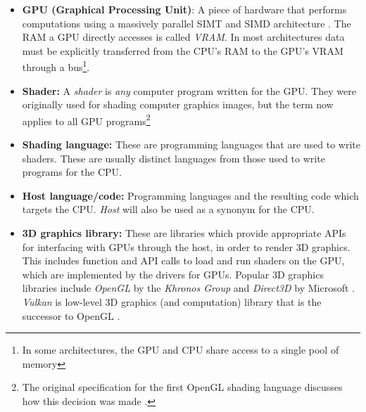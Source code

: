 \documentclass[a4paper,12pt,twoside,openright]{report}
\begin{document}
\begin{itemize}

    \item \textbf{GPU (Graphical Processing Unit)}: A piece of hardware
    that performs computations using a massively parallel SIMT and SIMD
    architecture \cite{TODO}. The RAM a GPU directly accesses is called
    \textit{VRAM}. In most architectures data must be explicitly transferred
    from the CPU's RAM to the GPU's VRAM through a bus\footnote{In some
    architectures, the GPU and CPU share access to a single pool of
    memory\cite{TODO}}.

    \item \textbf{Shader:} A \textit{shader} is \textit{any} computer
    program written for the GPU. They were originally used for shading computer
    graphics images, but the term now applies to all GPU programs\footnote{The
    original specification for the first OpenGL shading language discusses how
    this decision was made \cite{GLSL_1_10}.}

    \item \textbf{Shading language:} These are programming languages that are
    used to write shaders. These are usually distinct languages from those used
    to write programs for the CPU.

    \item \textbf{Host language/code:} Programming languages and the resulting
    code which targets the CPU. \textit{Host} will also be used as a synonym
    for the CPU.

    \item \textbf{3D graphics library:} These are libraries which provide
    appropriate APIs for interfacing with GPUs through the host, in order to
    render 3D graphics. This includes function and API calls to load and run
    shaders on the GPU, which are implemented by the drivers for GPUs. Popular
    3D graphics libraries include \textit{OpenGL} by the \textit{Khronos Group}
    and \textit{Direct3D} by Microsoft \cite{OpenGL} \cite{Direct3D}.
    \textit{Vulkan} is low-level 3D graphics (and computation) library that is
    the successor to OpenGL \cite{Vulkan}.



\end{itemize}
\end{document}

